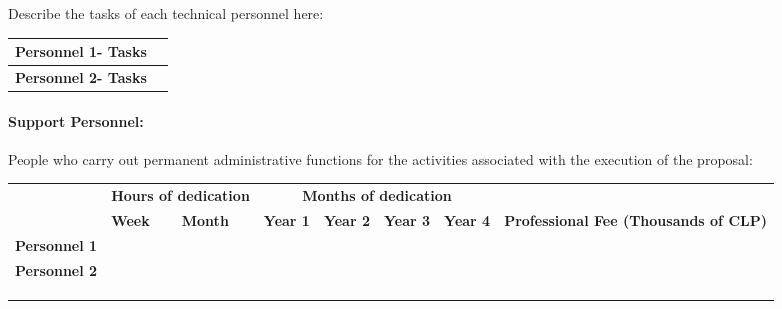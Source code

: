 \bigskip

\noindent Describe the tasks of each technical personnel here:

\smallskip

\noindent\begin{tabularx}{\linewidth}{|m{.3\linewidth}|X|}
\hline
\cellcolor{tcc}\textbf{Personnel 1- Tasks} & \\\hline
\cellcolor{tcc}\textbf{Personnel 2- Tasks} & \\\hline
\end{tabularx}

\paragraph*{Support Personnel:} People who carry out permanent administrative functions for the activities associated with the execution of the proposal:

\medskip

\noindent\begin{tabularx}{\linewidth}{|m{.26\linewidth}|X|X|X|X|X|X|m{.20\linewidth}|}
\hline
\cellcolor{tcc}
& \multicolumn{2}{c|}{\cellcolor{tcc}\begin{minipage}{.14\linewidth}\centering\textbf{Hours of dedication}\vspace{3pt}\end{minipage}}
& \multicolumn{4}{c|}{\cellcolor{tcc}\textbf{Months of dedication}}
& \cellcolor{tcc}
\tabularnewline
\hhline{|>{\arrayrulecolor{tcc}}->{\arrayrulecolor{black}}|------>{\arrayrulecolor{tcc}}->{\arrayrulecolor{black}}}
\multirow{-2}{*}{\cellcolor{tcc}\textbf{Support personnel}}
& \cellcolor{tcc}\centering\small\textbf{Week}
& \cellcolor{tcc}\centering\small\textbf{Month}
& \cellcolor{tcc}\centering\small\textbf{Year 1}
& \cellcolor{tcc}\centering\small\textbf{Year 2}
& \cellcolor{tcc}\centering\small\textbf{Year 3}
& \cellcolor{tcc}\centering\small\textbf{Year 4}
& \multirow{-2}{.20\textwidth}{\cellcolor{tcc}\centering\textbf{Professional Fee (Thousands of CLP)}}
\tabularnewline
\hline
\textbf{Personnel 1} & & & & & & & \\\hline
\textbf{Personnel 2} & & & & & & & \\\hline
 & & & & & & & \\\hline
 & & & & & & & \\\hline
 & & & & & & & \\\hline
\end{tabularx}

\bigskip

